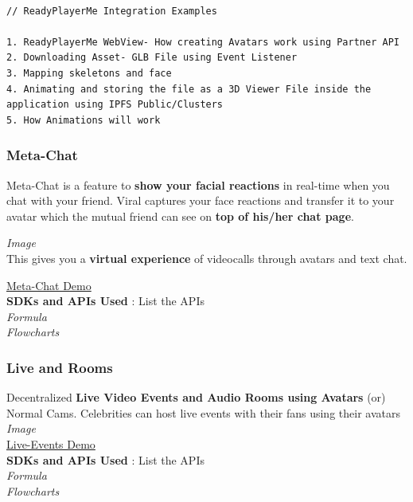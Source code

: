 \documentclass[10pt]{article}
\begin{document}
\begin{lstlisting}[language=Solidity]

// ReadyPlayerMe Integration Examples

1. ReadyPlayerMe WebView- How creating Avatars work using Partner API
2. Downloading Asset- GLB File using Event Listener
3. Mapping skeletons and face
4. Animating and storing the file as a 3D Viewer File inside the application using IPFS Public/Clusters
5. How Animations will work

\end{lstlisting}

\subsubsection{Meta-Chat}

Meta-Chat is a feature to \textbf{show your facial reactions} in real-time when you chat with your friend. Viral captures your face reactions and transfer it to your avatar which the mutual friend can see on \textbf{top of his/her chat page}.

\textit{Image}\\

This gives you a \textbf{virtual experience} of videocalls through avatars and text chat.

\hyperlink{https://sample.com}{Meta-Chat Demo}\\

\textbf{SDKs and APIs Used} : List the APIs\\

\textit{Formula\\
Flowcharts}

\subsubsection{Live and Rooms}

Decentralized \textbf{Live Video Events and Audio Rooms using Avatars} (or) Normal Cams. Celebrities can host live events with their fans using their avatars\\

\textit{Image}\\
\hyperlink{https://sample.com}{Live-Events Demo}\\

\textbf{SDKs and APIs Used} : List the APIs\\

\textit{Formula\\
Flowcharts}
\end{document}
